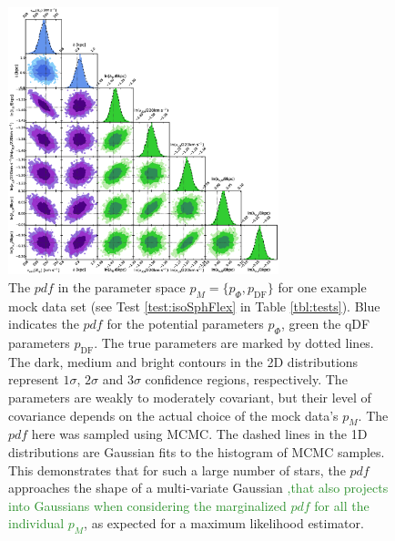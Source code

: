 \documentclass[iop,revtex4]{emulateapj}
\newcommand{\pdf}{\ensuremath{pdf}}
\newcommand{\pmodel}{\ensuremath{p_M}}
\newcommand{\NEW}[1]{\textcolor{ForestGreen}{#1}}
\newcommand{\OLD}[1]{}
\begin{document}
\OLD{We found that the required $N_\text{samples}$ to reach a given accuracy does not depend strongly on the number of stars in the sample. But in general we expect that we need higher accuracy and therefore more $N_\text{samples}$ for larger data sets.}
\OLD{A similar but one-dimensional treatment of measurement uncertainties in only $v_z$ was already applied by BR13.}


\begin{figure}[!htbp]
\centering
\includegraphics[width=0.7\textwidth]{figs/isoSphFlex_short_hot_2kpc_triangle_MCMC.eps}
\caption{The \pdf{} in the parameter space $\pmodel{} = \{p_\Phi,p_\text{DF}\}$ for one example mock data set (see Test \ref{test:isoSphFlex} in Table \ref{tbl:tests}). Blue indicates the \pdf{} for the potential parameters $p_\Phi$, green the qDF parameters $p_\text{DF}$. The true parameters are marked by dotted lines. The dark, medium and bright contours in the 2D distributions represent $1\sigma$, $2\sigma$ and $3\sigma$ confidence regions, respectively. The parameters are weakly to moderately covariant, but their level of covariance depends on the actual choice of the mock data's \pmodel{}. The \pdf{} here was sampled using MCMC. The dashed lines in the 1D distributions are Gaussian fits to the histogram of MCMC samples. This demonstrates \OLD{very well} that for such a large number of stars, the \pdf{} approaches the shape of a multi-variate Gaussian \NEW{,that also projects into Gaussians when considering the marginalized \pdf{} for all the individual \pmodel{}}, as expected for a maximum likelihood estimator.}
\label{fig:isoSphFlex_triangleplot}
\end{figure}
\end{document}
